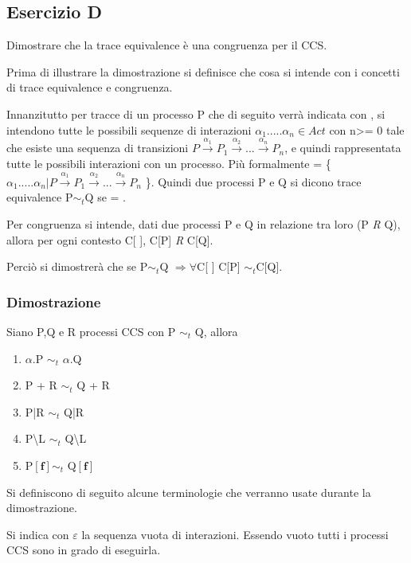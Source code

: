 \pagebreak
\subsection{Esercizio D} 
Dimostrare che la trace equivalence è una congruenza per il CCS.

Prima di illustrare la dimostrazione si definisce che cosa si intende con i concetti di trace equivalence e congruenza.

Innanzitutto per tracce di un processo P che di seguito verrà indicata con , si intendono tutte le possibili sequenze di interazioni $\alpha_{1}.....\alpha_{n} \in Act$ con n>= 0 tale che esiste una sequenza di transizioni $P \overset{\alpha_{1}}\rightarrow P_{1} \overset{\alpha_{2}}\rightarrow...\overset{\alpha_{n}}\rightarrow P_{n}$, e quindi rappresentata tutte le possibili interazioni con un processo. Più formalmente  = \{ $\alpha_{1}.....\alpha_{n} | P \overset{\alpha_{1}}\rightarrow P_{1} \overset{\alpha_{2}}\rightarrow...\overset{\alpha_{n}}\rightarrow P_{n}$ \}. Quindi due processi P e Q si dicono trace equivalence P$\sim_{t}$Q se  = .

Per congruenza si intende, dati due processi P e Q in relazione tra loro (P \textit{R} Q), allora per ogni contesto C[ ], C[P] \textit{R} C[Q]. 

Perciò si dimostrerà che se P$\sim_{t}$Q $\Rightarrow \forall$C[ ] C[P] $\sim_{t}$C[Q].

\subsubsection{Dimostrazione} 

Siano P,Q e R processi CCS con P $\sim_{t}$ Q, allora 

\begin{enumerate}
	\item $\alpha$.P $\sim_{t}$ $\alpha$.Q
	\item P + R $\sim_{t}$ Q + R
	\item P|R $\sim_{t}$ Q|R
	\item P\textbackslash L $\sim_{t}$ Q\textbackslash L
	\item P$\mathbf{[f]}\sim_{t}$ Q$\mathbf{[f]}$
\end{enumerate}

Si definiscono di seguito alcune terminologie che verranno usate durante la dimostrazione.

Si indica con $\varepsilon$ la sequenza vuota di interazioni. Essendo vuoto tutti i processi CCS sono in grado di eseguirla.

